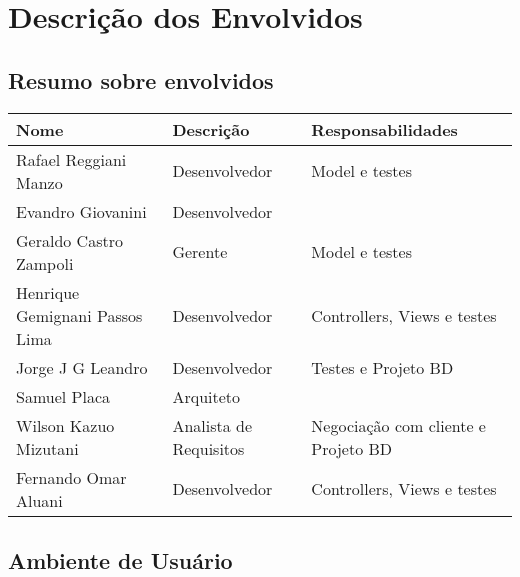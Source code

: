 \documentclass[11pt, a4paper]{article}
\begin{document}
    \section{Descrição dos Envolvidos}

\subsection{Resumo sobre envolvidos}

           \begin{tabular}{| l | l | l|}
                \hline
                Nome & Descrição & Responsabilidades \\ \hline
                Rafael Reggiani Manzo & Desenvolvedor & Model e testes\\  \hline
                Evandro Giovanini & Desenvolvedor &   \\ \hline
               Geraldo Castro Zampoli  & Gerente & Model e testes\\ \hline
                Henrique Gemignani Passos Lima & Desenvolvedor & Controllers, Views e testes\\ \hline
               Jorge J G Leandro  & Desenvolvedor & Testes e Projeto BD \\  \hline
              Samuel Placa & Arquiteto & \\ \hline
             Wilson Kazuo Mizutani  & Analista de Requisitos & Negociação com cliente e Projeto BD\\ \hline
             Fernando Omar Aluani   & Desenvolvedor & Controllers, Views e testes\\ \hline
                \hline
          \end{tabular}
         
  \subsection{Ambiente de Usuário}
\end{document}
